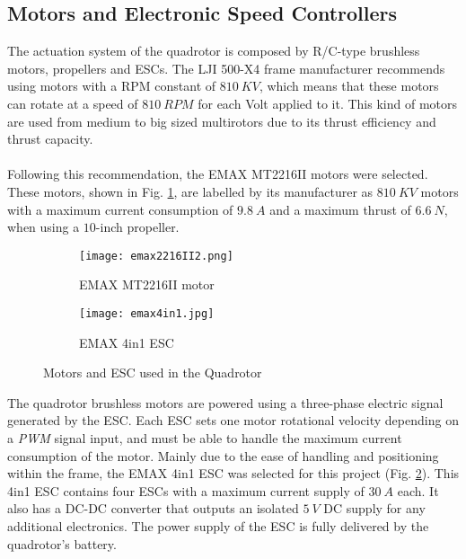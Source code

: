 \subsection{Motors and Electronic Speed Controllers}
The actuation system of the quadrotor is composed by R/C-type brushless motors, propellers and ESCs. The LJI 500-X4 frame manufacturer recommends using motors with a RPM constant of $810\ KV$, which means that these motors can rotate at a speed of $810\ RPM$ for each Volt applied to it. This kind of motors are used from medium to big sized multirotors due to its thrust efficiency and thrust capacity.
\\\\
Following this recommendation, the EMAX MT2216II motors were selected. These motors, shown in Fig. \ref{fig:emaxmotor}, are labelled by its manufacturer as $810\ KV$ motors with a maximum current consumption of $9.8\ A$ and a maximum thrust of $6.6\ N$, when using a $10$-inch propeller.
\begin{figure}[H]
\begin{subfigure}{.5\linewidth}
\centering
\texttt{[image: emax2216II2.png]}    
\caption{EMAX MT2216II motor} 
\label{fig:emaxmotor}
\end{subfigure}
\begin{subfigure}{.5\linewidth}
\centering
\texttt{[image: emax4in1.jpg]}    
\caption{EMAX 4in1 ESC} 
\label{fig:emaxESC}
\end{subfigure}
\caption[Motors and ESC used in the Quadrotor]{Motors and ESC used in the Quadrotor\protect\footnotemark}
\label{fig:motorandesc}
\end{figure}
The quadrotor brushless motors are powered using a three-phase electric signal generated by the ESC. Each ESC sets one motor rotational velocity depending on a \textit{PWM} signal input, and must be able to handle the maximum current consumption of the motor. Mainly due to the ease of handling and positioning within the frame, the EMAX 4in1 ESC was selected for this project (Fig. \ref{fig:emaxESC}). This 4in1 ESC contains four ESCs with a maximum current supply of $30\ A$ each. It also has a DC-DC converter that outputs an isolated $5\ V$ DC supply for any additional electronics. The power supply of the ESC is fully delivered by the quadrotor's battery.

